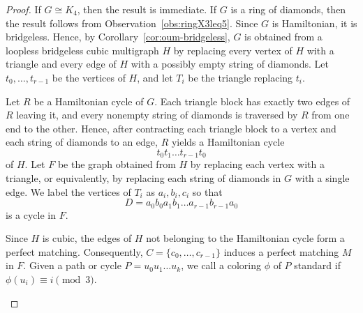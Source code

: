 \documentclass[10pt,a4paper]{article}
\providecommand{\tikzsetnextfilename}[1]{}
\theoremstyle{case}
\numberwithin{subcase}{case}
\begin{document}
\begin{proof}
If $G\cong K_4$, then the result is immediate. If $G$ is a ring of
diamonds, then the result follows from
Observation~\ref{obs:ringX3leq5}. Since $G$ is Hamiltonian, it is
bridgeless. Hence, by
Corollary~\ref{cor:oum-bridgeless}, $G$ is obtained from a loopless
bridgeless cubic multigraph $H$ by replacing every vertex of $H$ with
a triangle and every edge of $H$ with a possibly empty string of diamonds.
Let $t_0,\ldots,t_{r-1}$ be the vertices of $H$, and let $T_i$ be the
triangle replacing $t_i$.

Let $R$ be a Hamiltonian cycle of $G$. Each triangle block has exactly
two edges of $R$ leaving it, and every nonempty string of diamonds is
traversed by $R$ from one end to the other. Hence, after contracting
each triangle block to a vertex and each string of diamonds to an edge,
$R$ yields a Hamiltonian cycle
\[
t_0t_1\ldots t_{r-1}t_0
\]
of $H$.
Let $F$ be the graph obtained from $H$ by replacing each vertex with a
triangle, or equivalently, by replacing each string of diamonds in $G$
with a single edge. We label the vertices of $T_i$ as
$a_i,b_i,c_i$ so that
\[
D=a_0b_0a_1b_1\ldots a_{r-1}b_{r-1}a_0
\]
is a cycle in $F$.

Since $H$ is cubic, the edges of $H$ not belonging to the Hamiltonian
cycle form a perfect matching. Consequently,
$C=\{c_0,\ldots,c_{r-1}\}$ induces a perfect matching $M$ in $F$.
Given a path or cycle $P=u_0u_1\ldots u_k$, we call a coloring $\phi$
of $P$ standard if
$
\phi(u_i)\equiv i \pmod 3.
$

\begin{figure}[H]
    \centering


\tikzsetnextfilename{fig-cubic-standard}
\end{figure}
\end{proof}
\end{document}
